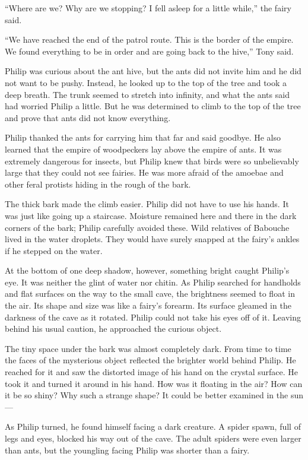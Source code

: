 \documentclass[10pt, draft]{memoir}
\begin{document}
``Where are we? Why are we stopping? I fell asleep for a little while,'' the fairy said.

``We have reached the end of the patrol route. This is the border of the empire. We found everything to be in order and are going back to the hive,'' Tony said.

Philip was curious about the ant hive, but the ants did not invite him and he did not want to be pushy. Instead, he looked up to the top of the tree and took a deep breath. The trunk seemed to stretch into infinity, and what the ants said had worried Philip a little. But he was determined to climb to the top of the tree and prove that ants did not know everything.

Philip thanked the ants for carrying him that far and said goodbye. He also learned that the empire of woodpeckers lay above the empire of ants. It was extremely dangerous for insects, but Philip knew that birds were so unbelievably large that they could not see fairies. He was more afraid of the amoebae and other feral protists hiding in the rough of the bark.

The thick bark made the climb easier. Philip did not have to use his hands. It was just like going up a staircase. Moisture remained here and there in the dark corners of the bark; Philip carefully avoided these. Wild relatives of Babouche lived in the water droplets. They would have surely snapped at the fairy's ankles if he stepped on the water.

At the bottom of one deep shadow, however, something bright caught Philip's eye. It was neither the glint of water nor chitin. As Philip searched for handholds and flat surfaces on the way to the small cave, the brightness seemed to float in the air. Its shape and size was like a fairy's forearm. Its surface gleamed in the darkness of the cave as it rotated. Philip could not take his eyes off of it. Leaving behind his usual caution, he approached the curious object.

The tiny space under the bark was almost completely dark. From time to time the faces of the mysterious object reflected the brighter world behind Philip. He reached for it and saw the distorted image of his hand on the crystal surface. He took it and turned it around in his hand. How was it floating in the air? How can it be so shiny? Why such a strange shape? It could be better examined in the sun---

As Philip turned, he found himself facing a dark creature. A spider spawn, full of legs and eyes, blocked his way out of the cave. The adult spiders were even larger than ants, but the youngling facing Philip was shorter than a fairy.
\end{document}
